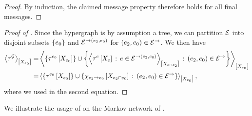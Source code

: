 \begin{proof}
    By induction, the claimed message property therefore holds for all final messages.
\end{proof}

\begin{proof}[Proof of ]
    Since the hypergraph is by assumption a tree, we can partition $\mathcal{E}$ into disjoint subsets $\{e_{0}\}$ and $\mathcal{E}^{\rightarrow(e_{2},e_{0})}$ for $(e_{2},e_{0})\in\mathcal{E}^{\rightarrow}$.
    We then have
    \begin{align*}
        \left\langle \tau^{\mathcal{G}}\right\rangle_{\left[ X_{e_{0}} \right]}
        =& \left\langle \{\tau^{e_{0}}\left[X_{e_{0}}\right]\}
            \cup \left\{\left\langle \tau^{e}\left[X_{e}\right]\,:\,e\in\mathcal{E}^{\rightarrow(e_{2},e_{0})}\right\rangle_{\left[ X_{e\cap e_{2}} \right]} \,:\, (e_{2},e_{0})\in\mathcal{E}^{\rightarrow} \right\}
        \right\rangle_{\left[ X_{e_{0}} \right]} \\
        =& \left\langle \{\tau^{e_{0}}\left[X_{e_{0}}\right]\} \cup \{\chi_{e_{2} \rightarrow e_{0}}\left[X_{e_{2} \cap e_{0}}\right] \,:\, (e_{2},e_{0})\in\mathcal{E}^{\rightarrow}\}\right\rangle_{\left[ X_{e_{0}} \right]},
    \end{align*}
    where we used  in the second equation.
\end{proof}

We illustrate the usage of  on the Markov network of .







